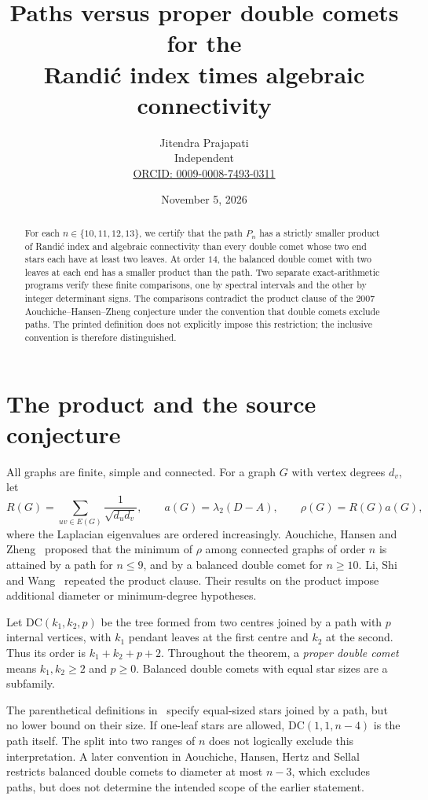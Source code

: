 \documentclass[11pt]{article}
\title{Paths versus proper double comets for the\protect\\ Randi\'c index times algebraic connectivity}
\author{Jitendra Prajapati\\[3pt]\small Independent\\
\small\href{https://orcid.org/0009-0008-7493-0311}{ORCID: 0009-0008-7493-0311}}
\date{November 5, 2026}
\newcommand{\DC}{\mathrm{DC}}
\newcommand{\ra}{\rho}
\begin{document}
\maketitle
\begin{abstract}
For each $n\in\{10,11,12,13\}$, we certify that the path $P_n$ has a strictly
smaller product of Randi\'c index and algebraic connectivity than every double
comet whose two end stars each have at least two leaves. At order $14$, the
balanced double comet with two leaves at each end has a smaller product than
the path. Two separate exact-arithmetic programs verify these finite
comparisons, one by spectral intervals and the other by integer determinant
signs. The comparisons contradict the product clause of the 2007
Aouchiche--Hansen--Zheng conjecture under the convention that double comets
exclude paths. The printed definition does not explicitly impose this
restriction; the inclusive convention is therefore distinguished.
\end{abstract}

\section{The product and the source conjecture}
All graphs are finite, simple and connected. For a graph $G$ with vertex
degrees $d_v$, let
\[
 R(G)=\sum_{uv\in E(G)}\frac{1}{\sqrt{d_ud_v}},\qquad
 a(G)=\lambda_2(D-A),\qquad \ra(G)=R(G)a(G),
\]
where the Laplacian eigenvalues are ordered increasingly.
Aouchiche, Hansen and Zheng~\cite[p.~98, Conjecture~4]{AHZ} proposed that
the minimum of $\ra$ among connected graphs of order $n$ is attained by a
path for $n\le9$, and by a balanced double comet for $n\ge10$.
Li, Shi and Wang~\cite[p.~845, Conjecture~1.2]{LSW} repeated the product
clause. Their results on the product impose additional diameter or
minimum-degree hypotheses.

Let $\DC(k_1,k_2,p)$ be the tree formed from two centres joined by a path
with $p$ internal vertices, with $k_1$ pendant leaves at the first centre
and $k_2$ at the second. Thus its order is $k_1+k_2+p+2$.
Throughout the theorem, a \emph{proper double comet} means
$k_1,k_2\ge2$ and $p\ge0$. Balanced double comets with equal star sizes
are a subfamily.

The parenthetical definitions in~\cite{AHZ,LSW} specify equal-sized stars
joined by a path, but no lower bound on their size. If one-leaf stars are
allowed, $\DC(1,1,n-4)$ is the path itself. The split into two ranges of
$n$ does not logically exclude this interpretation. A later convention
in Aouchiche, Hansen, Hertz and Sellal~\cite[Section~2]{AHHS} restricts
balanced double comets to diameter at most $n-3$, which excludes paths,
but does not determine the intended scope of the earlier statement.
\end{document}
